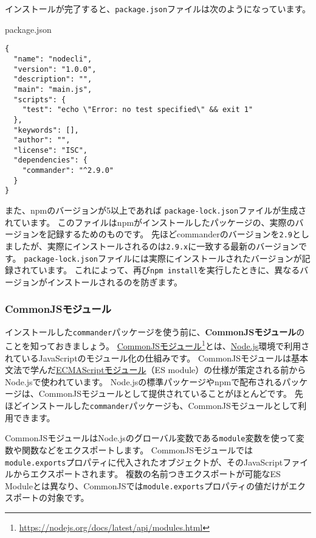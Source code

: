 インストールが完了すると、\texttt{package.json}ファイルは次のようになっています。

\begin{listtitle}
package.json
\end{listtitle}
\begin{lstlisting}
{
  "name": "nodecli",
  "version": "1.0.0",
  "description": "",
  "main": "main.js",
  "scripts": {
    "test": "echo \"Error: no test specified\" && exit 1"
  },
  "keywords": [],
  "author": "",
  "license": "ISC",
  "dependencies": {
    "commander": "^2.9.0"
  }
}
\end{lstlisting}
\listend

また、npmのバージョンが5以上であれば
\texttt{package-lock.json}ファイルが生成されています。
このファイルはnpmがインストールしたパッケージの、実際のバージョンを記録するためのものです。
先ほどcommanderのバージョンを\texttt{2.9}としましたが、実際にインストールされるのは\texttt{2.9.x}に一致する最新のバージョンです。
\texttt{package-lock.json}ファイルには実際にインストールされたバージョンが記録されています。
これによって、再び\texttt{npm install}を実行したときに、異なるバージョンがインストールされるのを防ぎます。

\hypertarget{commonjs-module}{%
\subsubsection{CommonJSモジュール}\label{commonjs-module}}

インストールした\texttt{commander}パッケージを使う前に、\textbf{CommonJSモジュール}のことを知っておきましょう。
\href{https://nodejs.org/docs/latest/api/modules.html}{CommonJSモジュール}\footnote{\url{https://nodejs.org/docs/latest/api/modules.html}}とは、\href{https://nodejs.org/ja/}{Node.js}環境で利用されているJavaScriptのモジュール化の仕組みです。
CommonJSモジュールは基本文法で学んだ\hyperlink{module}{ECMAScriptモジュール}（ES module）の仕様が策定される前からNode.jsで使われています。
Node.jsの標準パッケージやnpmで配布されるパッケージは、CommonJSモジュールとして提供されていることがほとんどです。
先ほどインストールした\texttt{commander}パッケージも、CommonJSモジュールとして利用できます。

CommonJSモジュールはNode.jsのグローバル変数である\texttt{module}変数を使って変数や関数などをエクスポートします。
CommonJSモジュールでは\texttt{module.exports}プロパティに代入されたオブジェクトが、そのJavaScriptファイルからエクスポートされます。
複数の名前つきエクスポートが可能なES
Moduleとは異なり、CommonJSでは\texttt{module.exports}プロパティの値だけがエクスポートの対象です。

